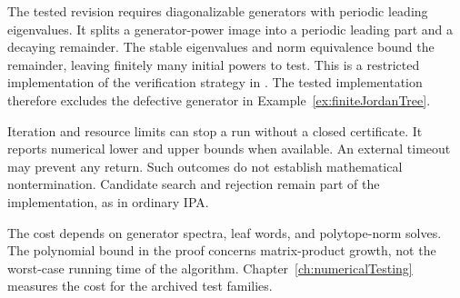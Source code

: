 The tested revision requires diagonalizable generators with periodic leading eigenvalues.
It splits a generator-power image into a periodic leading part and a decaying remainder.
The stable eigenvalues and norm equivalence bound the remainder, leaving finitely many initial powers to test.
This is a restricted implementation of the verification strategy in \citet[Section 3.3]{MejstrikReif2025HybridApproachJSR}.
The tested implementation therefore excludes the defective generator in Example~\ref{ex:finiteJordanTree}.

Iteration and resource limits can stop a run without a closed certificate.
It reports numerical lower and upper bounds when available.
An external timeout may prevent any return.
Such outcomes do not establish mathematical nontermination.
Candidate search and rejection remain part of the implementation, as in ordinary IPA.

The cost depends on generator spectra, leaf words, and polytope-norm solves.
The polynomial bound in the proof concerns matrix-product growth, not the worst-case running time of the algorithm.
Chapter~\ref{ch:numericalTesting} measures the cost for the archived test families.
